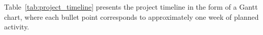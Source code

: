 Table~\ref{tab:project_timeline} presents the project timeline in the form of a Gantt chart, where each bullet point corresponds to approximately one week of planned activity.

\begin{table}[H]
  \centering
  \caption{Timetable of Activities}\label{tab:project_timeline}
\end{table}